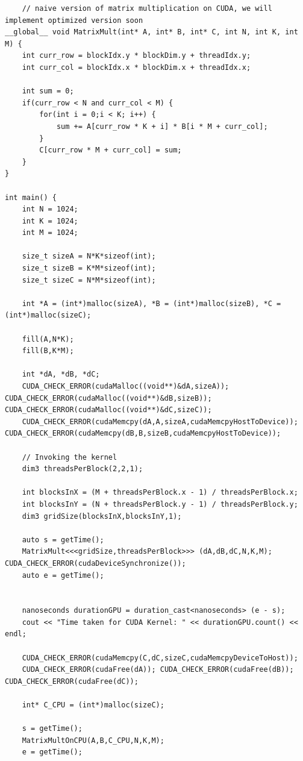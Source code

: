 \documentclass{article}
\begin{document}
\newpage


\begin{lstlisting}
    // naive version of matrix multiplication on CUDA, we will implement optimized version soon
__global__ void MatrixMult(int* A, int* B, int* C, int N, int K, int M) {
    int curr_row = blockIdx.y * blockDim.y + threadIdx.y;
    int curr_col = blockIdx.x * blockDim.x + threadIdx.x;

    int sum = 0;
    if(curr_row < N and curr_col < M) {
        for(int i = 0;i < K; i++) {
            sum += A[curr_row * K + i] * B[i * M + curr_col];
        }
        C[curr_row * M + curr_col] = sum;
    }
}

int main() {
    int N = 1024;
    int K = 1024;
    int M = 1024;

    size_t sizeA = N*K*sizeof(int);
    size_t sizeB = K*M*sizeof(int);
    size_t sizeC = N*M*sizeof(int);

    int *A = (int*)malloc(sizeA), *B = (int*)malloc(sizeB), *C = (int*)malloc(sizeC);

    fill(A,N*K);
    fill(B,K*M);

    int *dA, *dB, *dC;
    CUDA_CHECK_ERROR(cudaMalloc((void**)&dA,sizeA)); CUDA_CHECK_ERROR(cudaMalloc((void**)&dB,sizeB)); CUDA_CHECK_ERROR(cudaMalloc((void**)&dC,sizeC));
    CUDA_CHECK_ERROR(cudaMemcpy(dA,A,sizeA,cudaMemcpyHostToDevice)); CUDA_CHECK_ERROR(cudaMemcpy(dB,B,sizeB,cudaMemcpyHostToDevice));

    // Invoking the kernel
    dim3 threadsPerBlock(2,2,1);

    int blocksInX = (M + threadsPerBlock.x - 1) / threadsPerBlock.x;
    int blocksInY = (N + threadsPerBlock.y - 1) / threadsPerBlock.y;
    dim3 gridSize(blocksInX,blocksInY,1);

    auto s = getTime(); 
    MatrixMult<<<gridSize,threadsPerBlock>>> (dA,dB,dC,N,K,M); CUDA_CHECK_ERROR(cudaDeviceSynchronize());
    auto e = getTime();
    

    nanoseconds durationGPU = duration_cast<nanoseconds> (e - s);
    cout << "Time taken for CUDA Kernel: " << durationGPU.count() << endl;

    CUDA_CHECK_ERROR(cudaMemcpy(C,dC,sizeC,cudaMemcpyDeviceToHost));
    CUDA_CHECK_ERROR(cudaFree(dA)); CUDA_CHECK_ERROR(cudaFree(dB)); CUDA_CHECK_ERROR(cudaFree(dC));

    int* C_CPU = (int*)malloc(sizeC);

    s = getTime();
    MatrixMultOnCPU(A,B,C_CPU,N,K,M);
    e = getTime();


\end{lstlisting}
\end{document}
